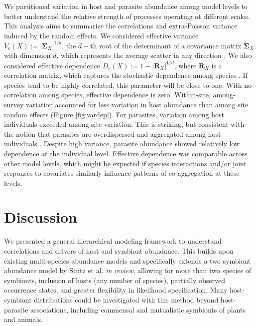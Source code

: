We partitioned variation in host and parasite abundance among model levels to better understand the relative strength of processes operating at different scales.
This analysis aims to summarize the correlations and extra-Poisson variance induced by the random effects.
We considered effective variance $V_e(X):=|\boldsymbol{\Sigma}_X|^{1/d}$, the $d-$th root of the determinant of a covariance matrix $\boldsymbol{\Sigma}_X$ with dimension $d$, which represents the average scatter in any direction \citep{Pena2003}.
We also considered effective dependence $D_e(X):= 1 - |\boldsymbol{R}_X|^{1/d}$, where $\boldsymbol{R}_X$ is a correlation matrix, which captures the stochastic dependence among species \citep{Pena2003}.
If species tend to be highly correlated, this parameter will be close to one.
With no correlation among species, effective dependence is zero.
Within-site, among-survey variation accounted for less variation in host abundance than among site random effects (Figure \ref{fig:vardep}).
For parasites, variation among host individuals exceeded among-site variation.
This is striking, but consistent with the notion that parasites are overdispersed and aggregated among host individuals \citep{Anderson1978b}.
Despite high variance, parasite abundance showed relatively low dependence at the individual level.
Effective dependence was comparable across other model levels, which might be expected if species interactions and/or joint responses to covariates similarly influence patterns of co-aggregation at these levels.

\section{Discussion}

We presented a general hierarchical modeling framework to understand correlations and drivers of host and symbiont abundance.
This builds upon existing multi-species abundance models and specifically extends a two symbiont abundance model by Stutz et al. \textit{in review}, allowing for more than two species of symbionts, inclusion of hosts (any number of species), partially observed occurrence states, and greater flexibility in likelihood specification.
Many host-symbiont distributions could be investigated with this method beyond host-parasite associations, including commensal and mutualistic symbionts of plants and animals.

